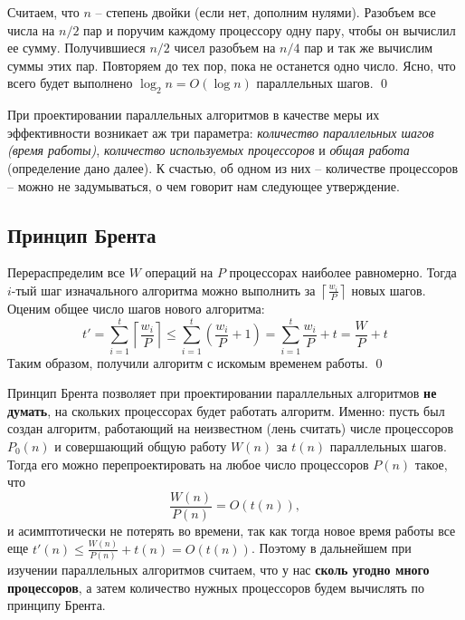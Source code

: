  Считаем, что $n$ -- степень двойки (если нет, дополним нулями).  Разобъем все числа на $n/2$ пар и поручим каждому процессору одну пару, чтобы он вычислил ее сумму. Получившиеся $n/2$ чисел разобъем на $n/4$ пар и так же вычислим суммы этих пар. Повторяем до тех пор, пока не останется одно число. Ясно, что всего будет выполнено $\log_2 n = O(\log n)$ параллельных шагов. \qed

При проектировании параллельных алгоритмов в качестве меры их эффективности возникает аж три параметра: \textit{количество параллельных шагов (время работы)}, \textit{количество используемых процессоров} и \textit{общая работа} (определение дано далее). К счастью, об одном из них -- количестве процессоров -- можно не задумываться, о чем говорит нам следующее утверждение.

\subsection{Принцип Брента}

 Перераспределим все $W$ операций на $P$ процессорах наиболее равномерно. Тогда $i$-тый шаг изначального алгоритма можно выполнить за $\left\lceil\frac{w_i}{P}\right\rceil$ новых шагов. Оценим общее число шагов нового алгоритма:
$$t' = \sum_{i=1}^t \left\lceil\frac{w_i}{P}\right\rceil \leq \sum_{i=1}^t \left(\frac{w_i}{P} + 1\right) = \sum_{i=1}^t \frac{w_i}{P} + t = \frac{W}{P} + t$$Таким образом, получили алгоритм с искомым временем работы. \qed

 Принцип Брента позволяет при проектировании параллельных алгоритмов \textbf{не думать}, на скольких процессорах будет работать алгоритм. Именно: пусть был создан алгоритм, работающий на неизвестном (лень считать) числе процессоров $P_0(n)$ и совершающий общую работу $W(n)$ за $t(n)$ параллельных шагов. Тогда его можно перепроектировать на любое число процессоров $P(n)$ такое, что $$\frac{W(n)}{P(n)} = O(t(n)),$$ и асимптотически не потерять во времени, так как тогда новое время работы все еще $t'(n) \leq \frac{W(n)}{P(n)} + t(n) = O(t(n))$. Поэтому в дальнейшем при изучении параллельных алгоритмов считаем, что у нас \textbf{сколь угодно много процессоров}, а затем количество нужных процессоров будем вычислять по принципу Брента.

